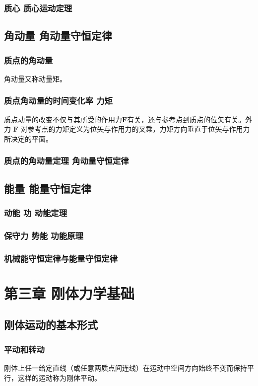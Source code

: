     \subsection{质心 质心运动定理}

\section{角动量 角动量守恒定律}
    \subsection{质点的角动量}
    角动量又称动量矩。
    \subsection{质点角动量的时间变化率 力矩}
    质点动量的改变不仅与其所受的作用力$\boldsymbol{F}$有关，还与参考点到质点的位矢有关。外力 $\boldsymbol{F}$ 对参考点的力矩定义为位矢与作用力的叉乘，力矩方向垂直于位矢与作用力所决定的平面。
    \subsection{质点的角动量定理 角动量守恒定律}

\section{能量 能量守恒定律}
    \subsection{动能 功 动能定理}
    \subsection{保守力 势能 功能原理}
    \subsection{机械能守恒定律与能量守恒定律}

\chapter{第三章 刚体力学基础}

\section{刚体运动的基本形式}
    \subsection{平动和转动}
    刚体上任一给定直线（或任意两质点间连线）在运动中空间方向始终不变而保持平行，这样的运动称为刚体平动。
